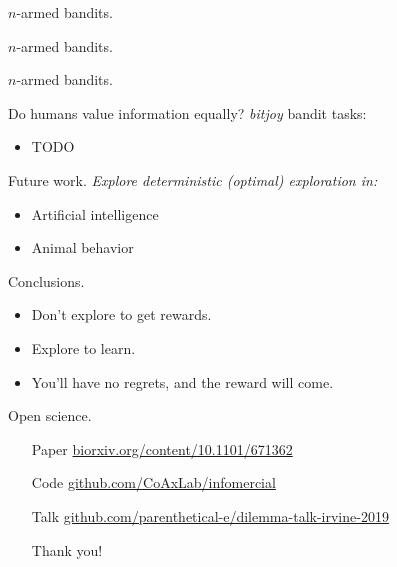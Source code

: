 \documentclass[10pt]{beamer}
\begin{document}
\begin{frame}[fragile]{$n$-armed bandits.}
\end{frame}

\begin{frame}[fragile]{$n$-armed bandits.}
\end{frame}

\begin{frame}[fragile]{$n$-armed bandits.}
\end{frame}

\begin{frame}[fragile]{Do humans value information equally?}
\textit{bitjoy} bandit tasks:
\begin{itemize}
    \item TODO
\end{itemize}
\end{frame}

\begin{frame}[fragile]{Future work.}
\textit{Explore deterministic (optimal) exploration in:}
\begin{itemize}
    \item Artificial intelligence
    \item Animal behavior
\end{itemize}
\end{frame}

\begin{frame}[fragile]{Conclusions.}
\begin{itemize}
    \item Don't explore to get rewards.
    \item Explore to learn.
    \item You'll have no regrets, and the reward will come.
\end{itemize}
\end{frame}

\begin{frame}[fragile]{Open science.}
\begin{itemize}
\item[Paper] \url{biorxiv.org/content/10.1101/671362}
\item[Code] \url{github.com/CoAxLab/infomercial}
\item[Talk] \url{github.com/parenthetical-e/dilemma-talk-irvine-2019}
\item[] 
\item[] \alert{Thank you!}
\end{itemize}
\end{frame}
\end{document}
